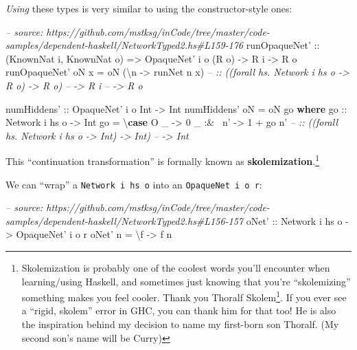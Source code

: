 \documentclass[]{article}
\newenvironment{Shaded}{\begin{snugshade}}{\end{snugshade}}
\newcommand{\CommentTok}[1]{\textcolor[rgb]{0.56,0.35,0.01}{\textit{#1}}}
\newcommand{\DataTypeTok}[1]{\textcolor[rgb]{0.13,0.29,0.53}{#1}}
\newcommand{\DecValTok}[1]{\textcolor[rgb]{0.00,0.00,0.81}{#1}}
\newcommand{\FunctionTok}[1]{\textcolor[rgb]{0.00,0.00,0.00}{#1}}
\newcommand{\KeywordTok}[1]{\textcolor[rgb]{0.13,0.29,0.53}{\textbf{#1}}}
\newcommand{\NormalTok}[1]{#1}
\newcommand{\OtherTok}[1]{\textcolor[rgb]{0.56,0.35,0.01}{#1}}
\renewcommand{\href}[2]{#2\footnote{\url{#1}}}
\begin{document}
\emph{Using} these types is very similar to using the constructor-style ones:

\begin{Shaded}
\begin{Highlighting}[]
\CommentTok{-- source: https://github.com/mstksg/inCode/tree/master/code-samples/dependent-haskell/NetworkTyped2.hs#L159-176}
\OtherTok{runOpaqueNet' ::}\NormalTok{ (}\DataTypeTok{KnownNat}\NormalTok{ i, }\DataTypeTok{KnownNat}\NormalTok{ o)}
              \OtherTok{=>} \DataTypeTok{OpaqueNet'}\NormalTok{ i o (}\DataTypeTok{R}\NormalTok{ o)}
              \OtherTok{->} \DataTypeTok{R}\NormalTok{ i}
              \OtherTok{->} \DataTypeTok{R}\NormalTok{ o}
\NormalTok{runOpaqueNet' oN x }\FunctionTok{=}\NormalTok{ oN (\textbackslash{}n }\OtherTok{->}\NormalTok{ runNet n x)}
\CommentTok{--            :: ((forall hs. Network i hs o -> R o) -> R o)}
\CommentTok{--            -> R i}
\CommentTok{--            -> R o}

\OtherTok{numHiddens' ::} \DataTypeTok{OpaqueNet'}\NormalTok{ i o }\DataTypeTok{Int} \OtherTok{->} \DataTypeTok{Int}
\NormalTok{numHiddens' oN }\FunctionTok{=}\NormalTok{ oN go}
  \KeywordTok{where}
\OtherTok{    go ::} \DataTypeTok{Network}\NormalTok{ i hs o }\OtherTok{->} \DataTypeTok{Int}
\NormalTok{    go }\FunctionTok{=}\NormalTok{ \textbackslash{}}\KeywordTok{case}
        \DataTypeTok{O}\NormalTok{ _      }\OtherTok{->} \DecValTok{0}
\NormalTok{        _ }\FunctionTok{:&~}\NormalTok{ n' }\OtherTok{->} \DecValTok{1} \FunctionTok{+}\NormalTok{ go n'}
\CommentTok{--          :: ((forall hs. Network i hs o -> Int) -> Int)}
\CommentTok{--          -> Int}
\end{Highlighting}
\end{Shaded}

This ``continuation transformation'' is formally known as
\textbf{skolemization}.\footnote{Skolemization is probably one of the coolest
  words you'll encounter when learning/using Haskell, and sometimes just knowing
  that you're ``skolemizing'' something makes you feel cooler. Thank you
  \href{https://en.wikipedia.org/wiki/Thoralf_Skolem}{Thoralf Skolem}. If you
  ever see a ``rigid, skolem'' error in GHC, you can thank him for that too! He
  is also the inspiration behind my decision to name my first-born son Thoralf.
  (My second son's name will be Curry)}

We can ``wrap'' a \texttt{Network\ i\ hs\ o} into an
\texttt{OpaqueNet\textquotesingle{}\ i\ o\ r}:

\begin{Shaded}
\begin{Highlighting}[]
\CommentTok{-- source: https://github.com/mstksg/inCode/tree/master/code-samples/dependent-haskell/NetworkTyped2.hs#L156-157}
\OtherTok{oNet' ::} \DataTypeTok{Network}\NormalTok{ i hs o }\OtherTok{->} \DataTypeTok{OpaqueNet'}\NormalTok{ i o r}
\NormalTok{oNet' n }\FunctionTok{=}\NormalTok{ \textbackslash{}f }\OtherTok{->}\NormalTok{ f n}
\end{Highlighting}
\end{Shaded}
\end{document}
